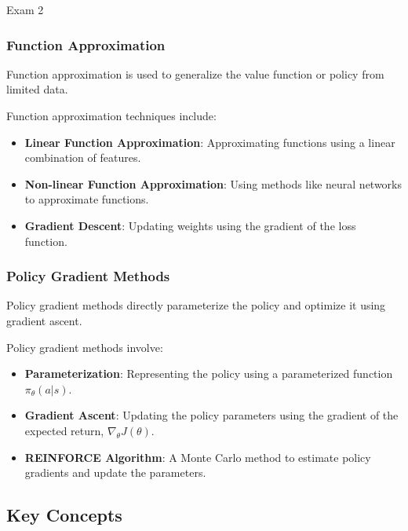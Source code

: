 \begin{examnotes}{Exam 2}
    \subsubsection*{Function Approximation}
    
    Function approximation is used to generalize the value function or policy from limited data.
    
    \begin{highlight}
        Function approximation techniques include:
        \begin{itemize}
            \item \textbf{Linear Function Approximation}: Approximating functions using a linear combination of features.
            \item \textbf{Non-linear Function Approximation}: Using methods like neural networks to approximate functions.
            \item \textbf{Gradient Descent}: Updating weights using the gradient of the loss function.
        \end{itemize}
    \end{highlight}
    
    \subsubsection*{Policy Gradient Methods}
    
    Policy gradient methods directly parameterize the policy and optimize it using gradient ascent.
    
    \begin{highlight}
        Policy gradient methods involve:
        \begin{itemize}
            \item \textbf{Parameterization}: Representing the policy using a parameterized function $\pi_{\theta}(a|s)$.
            \item \textbf{Gradient Ascent}: Updating the policy parameters using the gradient of the expected return, $\nabla_{\theta} J(\theta)$.
            \item \textbf{REINFORCE Algorithm}: A Monte Carlo method to estimate policy gradients and update the parameters.
        \end{itemize}
    \end{highlight}
    
    \subsection*{Key Concepts}
    

\end{examnotes}
